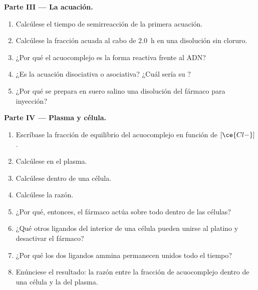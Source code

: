 \begin{problem}
\medskip\noindent\textbf{Parte III --- La acuación.}
\begin{enumerate}[resume]
  \item Calcúlese el tiempo de semirreacción de la primera acuación.
  \item Calcúlese la fracción acuada al cabo de \qty{2.0}{h} en una disolución sin cloruro.
  \item ¿Por qué el acuocomplejo es la forma reactiva frente al ADN?
  \item ¿Es la acuación disociativa o asociativa? ¿Cuál sería su ?
  \item ¿Por qué se prepara en suero salino una disolución del fármaco para inyección?
\end{enumerate}

\medskip\noindent\textbf{Parte IV --- Plasma y célula.}
\begin{enumerate}[resume]
  \item Escríbase la fracción de equilibrio del acuocomplejo en función de
        $[\ce{Cl-}]$.
  \item Calcúlese en el plasma.
  \item Calcúlese dentro de una célula.
  \item Calcúlese la razón.
  \item ¿Por qué, entonces, el fármaco actúa sobre todo dentro de las células?
  \item ¿Qué otros ligandos del interior de una célula pueden unirse al platino y desactivar el
        fármaco?
  \item ¿Por qué los dos ligandos ammina permanecen unidos todo el tiempo?
  \item Enúnciese el resultado: la razón entre la fracción de acuocomplejo dentro de una célula y
        la del plasma.
\end{enumerate}
\end{problem}
